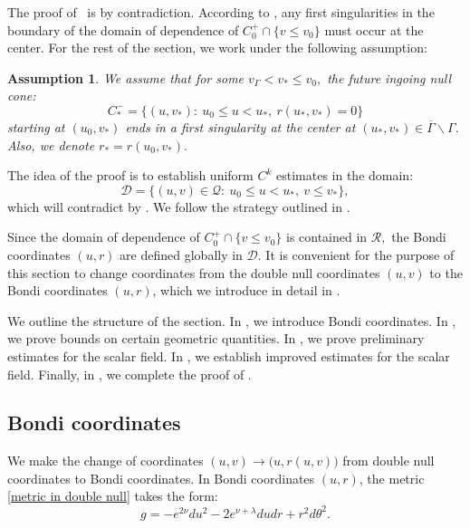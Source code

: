\documentclass[11pt]{article}
\newtheorem{assumption}{Assumption}[section]
\numberwithin{equation}{section}
\begin{document}
The proof of~ is by contradiction. According to , any first singularities in the boundary of the domain of dependence of $C_0^+\cap\{v\leq v_0\}$ must occur at the center. For the rest of the section, we work under the following assumption:
\begin{assumption}\label{assumption mass gap}
    We assume that for some $v_{\Gamma}<v_*\leq v_0,$ the future ingoing null cone: 
    \[C_*^-=\Big\{(u,v_*):\ u_0\leq u<u_*,\ r(u_*,v_*)=0\Big\}\] 
    starting at $(u_0,v_*)$ ends in a first singularity at the center at $(u_*,v_*)\in\overline{\Gamma}\backslash\Gamma.$ Also, we denote $r_*=r(u_0,v_*).$
\end{assumption}
The idea of the proof is to establish uniform $C^k$ estimates in the domain:
\begin{equation}\label{domain D}
    \mathcal{D}=\Big\{(u,v)\in\mathcal{Q}:\ u_0\leq u<u_*,\ v\leq v_*\Big\},
\end{equation}
which will contradict  by . We follow the strategy outlined in .

Since the domain of dependence of $C_0^+\cap\{v\leq v_0\}$ is contained in $\mathcal{R},$ the Bondi coordinates $(u,r)$ are defined globally in $\mathcal{D}.$ It is convenient for the purpose of this section to change coordinates from the double null coordinates $(u,v)$ to the Bondi coordinates $(u,r)$, which we introduce in detail in .

We outline the structure of the section. In , we introduce Bondi coordinates. In , we prove bounds on certain geometric quantities. In , we prove preliminary estimates for the scalar field. In , we establish improved estimates for the scalar field. Finally, in , we complete the proof of .

\subsection{Bondi coordinates}\label{eqts in Bondi section}
We make the change of coordinates $(u,v)\rightarrow\big(u,r(u,v)\big)$ from double null coordinates to Bondi coordinates. In Bondi coordinates $(u,r)$, the metric \eqref{metric in double null} takes the form:
\begin{equation}\label{metric in Bondi}
    g=-e^{2\nu}du^2-2e^{\nu+\lambda}dudr+r^2d\theta^2.
\end{equation}
\end{document}
